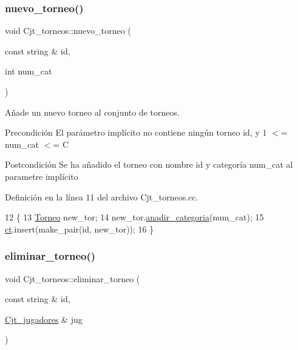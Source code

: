 \subsubsection{\texorpdfstring{nuevo\+\_\+torneo()}{nuevo\_torneo()}}
{\footnotesize\ttfamily void Cjt\+\_\+torneos\+::nuevo\+\_\+torneo (\begin{DoxyParamCaption}\item[{const string \&}]{id,  }\item[{int}]{num\+\_\+cat }\end{DoxyParamCaption})}



Añade un nuevo torneo al conjunto de torneos. 

\begin{DoxyPrecond}{Precondición}
El parámetro implícito no contiene ningún torneo id, y 1 $<$= num\+\_\+cat $<$= C 
\end{DoxyPrecond}
\begin{DoxyPostcond}{Postcondición}
Se ha añadido el torneo con nombre id y categoría num\+\_\+cat al parametre implícito 
\end{DoxyPostcond}


Definición en la línea 11 del archivo Cjt\+\_\+torneos.\+cc.


\begin{DoxyCode}
12 \{
13     \hyperlink{class_torneo}{Torneo} new\_tor;
14     new\_tor.\hyperlink{class_torneo_a089468654daf52979cd7c393c51ceb85}{anadir\_categoria}(num\_cat);
15     \hyperlink{class_cjt__torneos_a701df4fc4fbd2d6ffa081a01845083f3}{ct}.insert(make\_pair(\textcolor{keywordtype}{id}, new\_tor));
16 \}
\end{DoxyCode}
\mbox{\label{class_cjt__torneos_abcf5af8c44e1a82fec482aa1a0abacb2}} 
\subsubsection{\texorpdfstring{eliminar\+\_\+torneo()}{eliminar\_torneo()}}
{\footnotesize\ttfamily void Cjt\+\_\+torneos\+::eliminar\+\_\+torneo (\begin{DoxyParamCaption}\item[{const string \&}]{id,  }\item[{\hyperlink{class_cjt__jugadores}{Cjt\+\_\+jugadores} \&}]{jug }\end{DoxyParamCaption})}



